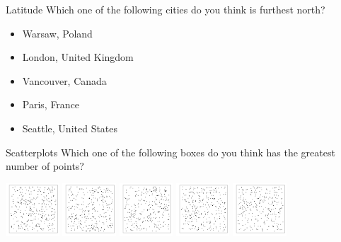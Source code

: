 \documentclass{beamer}
\begin{document}
\begin{frame}{Latitude}
Which one of the following cities do you think is furthest north?

\begin{itemize}
	\item Warsaw, Poland
	\item London, United Kingdom
	\item Vancouver, Canada
	\item Paris, France
	\item Seattle, United States
\end{itemize}
\end{frame}

\begin{frame}{Scatterplots}
Which one of the following boxes do you think has the greatest number of points?

\vspace{0.5cm}
\includegraphics[height=2cm]{Scatterplots1.pdf}
\includegraphics[height=2cm]{Scatterplots2.pdf}
\includegraphics[height=2cm]{Scatterplots3.pdf}
\includegraphics[height=2cm]{Scatterplots4.pdf}
\includegraphics[height=2cm]{Scatterplots5.pdf}
\end{frame}
\end{document}
